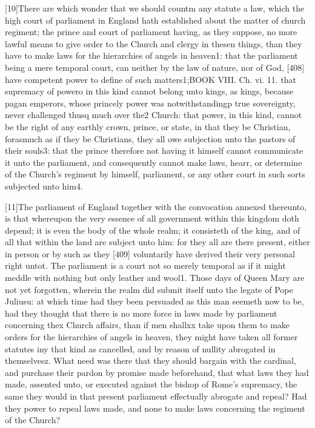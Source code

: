 [10]There are which wonder that we should countm any statute a law, which the high court of parliament in England hath established about the matter of church regiment; the prince and court of parliament having, as they suppose, no more lawful means to give order to the Church and clergy in thesen things, than they have to make laws for the hierarchies of angels in heaven1: that the parliament being a mere temporal court, can neither by the law of nature, nor of God, [408] have competent power to define of such matters1;BOOK VIII. Ch. vi. 11. that supremacy of powero in this kind cannot belong unto kings, as kings, because pagan emperors, whose princely power was notwithstandingp true sovereignty, never challenged thusq much over the2 Church: that power, in this kind, cannot be the right of any earthly crown, prince, or state, in that they be Christian, forasmuch as if they be Christians, they all owe subjection unto the pastors of their souls3: that the prince therefore not having it himself cannot communicate it unto the parliament, and consequently cannot make laws, hearr, or determine of the Church’s regiment by himself, parliament, or any other court in such sorts subjected unto him4.

[11]The parliament of England together with the convocation annexed thereunto, is that whereupon the very essence of all government within this kingdom doth depend; it is even the body of the whole realm; it consisteth of the king, and of all that within the land are subject unto him: for they all are there present, either in person or by such as they [409] voluntarily have derived their very personal right untot. The parliament is a court not so merely temporal as if it might meddle with nothing but only leather and wool1. Those days of Queen Mary are not yet forgotten, wherein the realm did submit itself unto the legate of Pope Juliusu: at which time had they been persuaded as this man seemeth now to be, had they thought that there is no more force in laws made by parliament concerning thex Church affairs, than if men shallxx take upon them to make orders for the hierarchies of angels in heaven, they might have taken all former statutes iny that kind as cancelled, and by reason of nullity abrogated in themselvesz. What need was there that they should bargain with the cardinal, and purchase their pardon by promise made beforehand, that what laws they had made, assented unto, or executed against the bishop of Rome’s supremacy, the same they would in that present parliament effectually abrogate and repeal? Had they power to repeal laws made, and none to make laws concerning the regiment of the Church?

